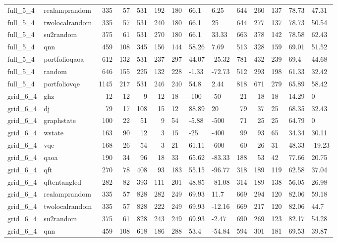\begin{longtable}{llrrrrlllrrlll}
full\_5\_4 & realamprandom & 335 & 57 & 531 & 192 & 180 & 66.1 & 6.25 & 644 & 260 & 137 & 78.73 & 47.31 \\
full\_5\_4 & twolocalrandom & 335 & 57 & 531 & 240 & 180 & 66.1 & 25 & 644 & 277 & 137 & 78.73 & 50.54 \\
full\_5\_4 & su2random & 375 & 61 & 531 & 270 & 180 & 66.1 & 33.33 & 663 & 378 & 142 & 78.58 & 62.43 \\
full\_5\_4 & qnn & 459 & 108 & 345 & 156 & 144 & 58.26 & 7.69 & 513 & 328 & 159 & 69.01 & 51.52 \\
full\_5\_4 & portfolioqaoa & 612 & 132 & 531 & 237 & 297 & 44.07 & -25.32 & 781 & 432 & 239 & 69.4 & 44.68 \\
full\_5\_4 & random & 646 & 155 & 225 & 132 & 228 & -1.33 & -72.73 & 512 & 293 & 198 & 61.33 & 32.42 \\
full\_5\_4 & portfoliovqe & 1145 & 217 & 531 & 246 & 240 & 54.8 & 2.44 & 818 & 671 & 279 & 65.89 & 58.42 \\
grid\_6\_4 & ghz & 12 & 12 & 9 & 12 & 18 & -100 & -50 & 21 & 18 & 18 & 14.29 & 0 \\
grid\_6\_4 & dj & 79 & 17 & 108 & 15 & 12 & 88.89 & 20 & 79 & 37 & 25 & 68.35 & 32.43 \\
grid\_6\_4 & graphstate & 100 & 22 & 51 & 9 & 54 & -5.88 & -500 & 71 & 25 & 25 & 64.79 & 0 \\
grid\_6\_4 & wstate & 163 & 90 & 12 & 3 & 15 & -25 & -400 & 99 & 93 & 65 & 34.34 & 30.11 \\
grid\_6\_4 & vqe & 168 & 26 & 54 & 3 & 21 & 61.11 & -600 & 60 & 26 & 31 & 48.33 & -19.23 \\
grid\_6\_4 & qaoa & 190 & 34 & 96 & 18 & 33 & 65.62 & -83.33 & 188 & 53 & 42 & 77.66 & 20.75 \\
grid\_6\_4 & qft & 270 & 78 & 408 & 93 & 183 & 55.15 & -96.77 & 318 & 189 & 119 & 62.58 & 37.04 \\
grid\_6\_4 & qftentangled & 282 & 82 & 393 & 111 & 201 & 48.85 & -81.08 & 314 & 189 & 138 & 56.05 & 26.98 \\
grid\_6\_4 & realamprandom & 335 & 57 & 828 & 282 & 249 & 69.93 & 11.7 & 669 & 294 & 120 & 82.06 & 59.18 \\
grid\_6\_4 & twolocalrandom & 335 & 57 & 828 & 222 & 249 & 69.93 & -12.16 & 669 & 217 & 120 & 82.06 & 44.7 \\
grid\_6\_4 & su2random & 375 & 61 & 828 & 243 & 249 & 69.93 & -2.47 & 690 & 269 & 123 & 82.17 & 54.28 \\
grid\_6\_4 & qnn & 459 & 108 & 618 & 186 & 288 & 53.4 & -54.84 & 594 & 301 & 181 & 69.53 & 39.87 \\

\end{longtable}
